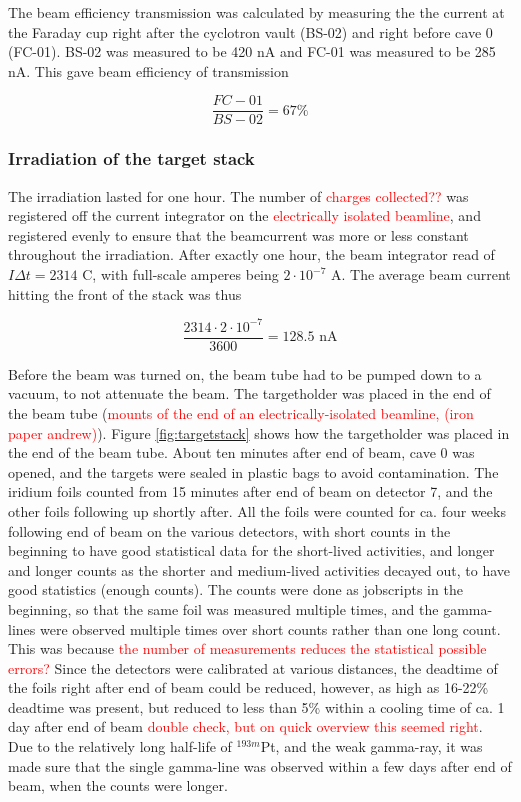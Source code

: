 \noindent
The beam efficiency transmission was calculated by measuring the the current at the Faraday cup right after the cyclotron vault (BS-02) and right before cave 0 (FC-01). BS-02 was measured to be 420 nA and FC-01 was measured to be 285 nA. This gave beam efficiency of transmission

$$\frac{FC-01}{BS-02}=67\% $$


\subsubsection{Irradiation of the target stack} 
The irradiation lasted for one hour. The number of \textcolor{red}{charges collected??} was registered off the current integrator on the \textcolor{red}{electrically isolated beamline}, and registered evenly to ensure that the beamcurrent was more or less constant throughout the irradiation. After exactly one hour, the beam integrator read of $I\Delta t= 2314$ C, with full-scale amperes being $2\cdot10^{-7}$ A. The average beam current hitting the front of the stack was thus 

\begin{equation}
    \frac{2314\cdot 2\cdot10^{-7}}{3600 } = 128.5 \text{ nA}
\end{equation}

Before the beam was turned on, the beam tube had to be pumped down to a vacuum, to not attenuate the beam. The targetholder was placed in the end of the beam tube (\textcolor{red}{mounts of the end of an electrically-isolated beamline, (iron paper andrew)}). Figure \ref{fig:targetstack} shows how the targetholder was placed in the end of the beam tube. About ten minutes after end of beam, cave 0 was opened, and the targets were sealed in plastic bags to avoid contamination. The iridium foils counted from 15 minutes after end of beam on detector 7, and the other foils following up shortly after. All the foils were counted for ca. four weeks following end of beam on the various detectors, with short counts in the beginning to have good statistical data for the short-lived activities, and longer and longer counts as the shorter and medium-lived activities decayed out, to have good statistics (enough counts). The counts were done as jobscripts in the beginning, so that the same foil was measured multiple times, and the gamma-lines were observed multiple times over short counts rather than one long count. This was because \textcolor{red}{the number of measurements reduces the statistical possible errors?}  Since the detectors were calibrated at various distances, the deadtime of the foils right after end of beam could be reduced, however, as high as  16-22\% deadtime was present, but reduced to less than 5\% within a cooling time of ca. 1 day after end of beam \textcolor{red}{double check, but on quick overview this seemed right}.
Due to the relatively long half-life of $^{193m}$Pt, and the weak gamma-ray, it was made sure that the single gamma-line was observed within a few days after end of beam, when the counts were longer. 

